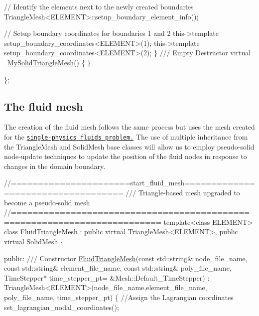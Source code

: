 \begin{DoxyCodeInclude}

   \textcolor{comment}{// Identify the elements next to the newly created boundaries}
   TriangleMesh<ELEMENT>::setup\_boundary\_element\_info();
   
   \textcolor{comment}{// Setup boundary coordinates for boundaries 1 and 2}
   this->\textcolor{keyword}{template} setup\_boundary\_coordinates<ELEMENT>(1);
   this->\textcolor{keyword}{template} setup\_boundary\_coordinates<ELEMENT>(2);
  \}
 \textcolor{comment}{}
\textcolor{comment}{ /// Empty Destructor}
\textcolor{comment}{} \textcolor{keyword}{virtual} ~\hyperlink{classMySolidTriangleMesh}{MySolidTriangleMesh}() \{ \}

\};

\end{DoxyCodeInclude}




\hypertarget{index_fluid_mesh}{}\subsection{The fluid mesh}\label{index_fluid_mesh}
The creation of the fluid mesh follows the same process but uses the mesh created for the \href{../../../navier_stokes/unstructured_fluid/html/index.html}{\tt single-\/physics fluids problem.} The use of multiple inheritance from the {\ttfamily Triangle\+Mesh} and {\ttfamily Solid\+Mesh} base classes will allow us to employ pseudo-\/solid node-\/update techniques to update the position of the fluid nodes in response to changes in the domain boundary.


\begin{DoxyCodeInclude}
\textcolor{comment}{//======================start\_fluid\_mesh===================================}
\textcolor{comment}{/// Triangle-based mesh upgraded to become a pseudo-solid mesh}
\textcolor{comment}{}\textcolor{comment}{//=========================================================================}
\textcolor{keyword}{template}<\textcolor{keyword}{class} ELEMENT>
\textcolor{keyword}{class }\hyperlink{classFluidTriangleMesh}{FluidTriangleMesh} : \textcolor{keyword}{public} \textcolor{keyword}{virtual} TriangleMesh<ELEMENT>,
                          \textcolor{keyword}{public} \textcolor{keyword}{virtual} SolidMesh 
\{
 
\textcolor{keyword}{public}:
 \textcolor{comment}{}
\textcolor{comment}{ /// Constructor}
\textcolor{comment}{} \hyperlink{classFluidTriangleMesh_ab86c8fd8ee699923f5a4b199981d8c76}{FluidTriangleMesh}(\textcolor{keyword}{const} std::string& node\_file\_name,
                   \textcolor{keyword}{const} std::string& element\_file\_name,
                   \textcolor{keyword}{const} std::string& poly\_file\_name,
                   TimeStepper* time\_stepper\_pt=
                   &Mesh::Default\_TimeStepper) :
  TriangleMesh<ELEMENT>(node\_file\_name,element\_file\_name,
                        poly\_file\_name, time\_stepper\_pt)
  \{
   \textcolor{comment}{//Assign the Lagrangian coordinates}
   set\_lagrangian\_nodal\_coordinates();

\end{DoxyCodeInclude}


